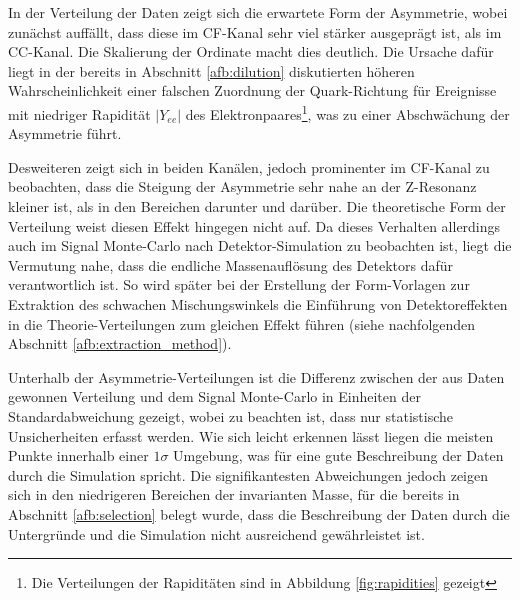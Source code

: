 In der Verteilung der Daten zeigt sich die erwartete Form der
Asymmetrie, wobei zunächst auffällt, dass diese
im \ac{CF}-Kanal sehr viel stärker ausgeprägt ist, als im \ac{CC}-Kanal. Die
Skalierung der Ordinate macht dies deutlich. Die Ursache dafür liegt in der
bereits in Abschnitt \ref{afb:dilution} diskutierten höheren Wahrscheinlichkeit
einer falschen Zuordnung der Quark-Richtung für Ereignisse mit niedriger
Rapidität $|Y_{ee}|$ des Elektronpaares\footnote{Die Verteilungen der Rapiditäten
sind in Abbildung \ref{fig:rapidities} gezeigt}, was zu einer Abschwächung der
Asymmetrie führt.

Desweiteren zeigt sich in beiden Kanälen, jedoch prominenter im \ac{CF}-Kanal
zu beobachten, dass die Steigung der Asymmetrie sehr nahe an der Z-Resonanz
kleiner ist, als in den Bereichen darunter und darüber. Die theoretische Form
der Verteilung weist diesen Effekt hingegen nicht auf. Da
dieses Verhalten allerdings auch im Signal Monte-Carlo nach Detektor-Simulation
zu beobachten ist, liegt
die Vermutung nahe, dass die endliche Massenauflösung des Detektors dafür
verantwortlich ist. So wird später bei der Erstellung der Form-Vorlagen zur
Extraktion des schwachen Mischungswinkels die Einführung von Detektoreffekten
in die Theorie-Verteilungen zum gleichen Effekt führen (siehe nachfolgenden
Abschnitt \ref{afb:extraction_method}).

Unterhalb der Asymmetrie-Verteilungen ist die Differenz zwischen der aus Daten
gewonnen Verteilung und dem Signal Monte-Carlo in Einheiten der Standardabweichung
gezeigt, wobei zu beachten ist, dass nur statistische Unsicherheiten erfasst
werden. Wie sich leicht erkennen lässt liegen die meisten Punkte innerhalb
einer $1\sigma$ Umgebung, was für eine gute Beschreibung der Daten durch die
Simulation spricht. Die signifikantesten Abweichungen jedoch zeigen sich in den
niedrigeren Bereichen der invarianten Masse, für die bereits in Abschnitt
\ref{afb:selection} belegt wurde, dass die Beschreibung der Daten durch die
Untergründe und die Simulation nicht ausreichend gewährleistet ist.

